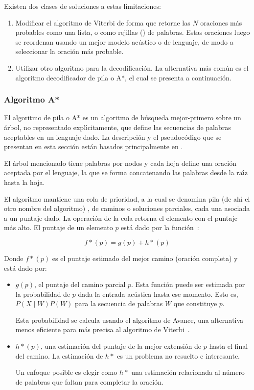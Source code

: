 Existen dos clases de soluciones a estas limitaciones:
\begin{enumerate}
	\item Modificar el algoritmo de Viterbi de forma que retorne las $N$ oraciones m\'as probables como una lista, o como 
	rejillas () de palabras. Estas oraciones luego se reordenan usando un mejor modelo ac\'ustico o de lenguaje,
	de modo a seleccionar la oraci\'on m\'as probable.
	\item Utilizar otro algoritmo para la decodificaci\'on. La alternativa m\'as com\'un es el algoritmo decodificador de pila o A*, el cual
	se presenta a continuaci\'on.
\end{enumerate}

\subsubsection{Algoritmo A*}
El algoritmo de pila o A* es un algoritmo de b\'usqueda mejor-primero sobre un \'arbol, no representado expl{\'\i}citamente, que define las
secuencias de palabras aceptables en un lenguaje dado. La descripci\'on y el pseudoc\'odigo que se presentan en esta secci\'on
est\'an basados principalmente en \cite{Jurafsky, PaulEfficient1992}.

El \'arbol mencionado tiene palabras por nodos y cada hoja define una oraci\'on aceptada por el lenguaje, la que se forma concatenando las 
palabras desde la ra{\'\i}z hasta la hoja.  

El algoritmo mantiene una cola de prioridad, a la cual se denomina pila (de ah{\'\i} el otro nombre del algoritmo) \cite{PostStack}, 
de caminos o soluciones parciales, cada una asociada a un puntaje dado. La operaci\'on  de la cola retorna el elemento 
con el puntaje m\'as alto. El puntaje de un elemento $p$ est\'a dado por la \mbox{funci\'on \cite{Jurafsky, Russell2003Solving}}:

\begin{equation*}
	f*(p) = g(p) + h*(p)
\end{equation*}

Donde $f*(p)$ es el puntaje estimado del mejor camino (oraci\'on completa) y est\'a dado por:

\begin{itemize}
 	\item $g(p)$, el puntaje del camino parcial $p$. Esta funci\'on puede ser estimada por la probabilidad de $p$ dada la entrada ac\'ustica
 	hasta ese momento. Esto es, $P(X \mid W)P(W)$ para la secuencia de palabras $W$ que constituye $p$. 

 	Esta probabilidad se calcula usando el algoritmo de Avance, una alternativa menos eficiente para m\'as precisa al algoritmo de 
 	\mbox{Viterbi \cite{Jurafsky}}.

 	\item $h*(p)$, una estimaci\'on del puntaje de la mejor extensi\'on de $p$ hasta el final del camino. La estimaci\'on de $h*$ es un problema
 	no resuelto e interesante. 

 	Un enfoque posible es elegir como $h*$ una estimaci\'on relacionada al n\'umero de palabras que faltan para
 	completar la oraci\'on.
 \end{itemize}

